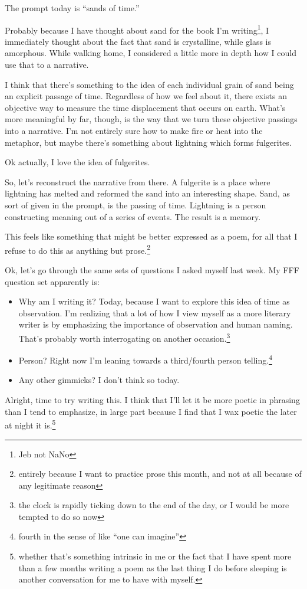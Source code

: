 \documentclass[12pt]{article}[titlepage]
\newcommand{\say}[1]{``#1''}
\newcommand{\1}{\={a}}
\newcommand{\2}{\={e}}
\newcommand{\3}{\={\i}}
\newcommand{\4}{\=o}
\newcommand{\5}{\=u}
\newcommand{\6}{\={A}}
\renewcommand{\,}{\textsuperscript{,}}
\begin{document}
The prompt today is \say{sands of time.}

Probably because I have thought about sand for the book I'm writing\footnote{Jeb not NaNo}, I immediately thought about the fact that sand is crystalline, while glass is amorphous.
While walking home, I considered a little more in depth how I could use that to a narrative.

I think that there's something to the idea of each individual grain of sand being an explicit passage of time.
Regardless of how we feel about it, there exists an objective way to measure the time displacement that occurs on earth.
What's more meaningful by far, though, is the way that we turn these objective passings into a narrative.
I'm not entirely sure how to make fire or heat into the metaphor, but maybe there's something about lightning which forms fulgerites.

Ok actually, I love the idea of fulgerites.

So, let's reconstruct the narrative from there.
A fulgerite is a place where lightning has melted and reformed the sand into an interesting shape.
Sand, as sort of given in the prompt, is the passing of time.
Lightning is a person constructing meaning out of a series of events.
The result is a memory.

This feels like something that might be better expressed as a poem, for all that I refuse to do this as anything but prose.\footnote{entirely because I want to practice prose this month, and not at all because of any legitimate reason}

Ok, let's go through the same sets of questions I asked myself last week.
My FFF question set apparently is:
\begin{itemize}
\item Why am I writing it? Today, because I want to explore this idea of time as observation.
I'm realizing that a lot of how I view myself as a more literary writer is by emphasizing the importance of observation and human naming.
That's probably worth interrogating on another occasion.\footnote{the clock is rapidly ticking down to the end of the day, or I would be more tempted to do so now}
\item Person? Right now I'm leaning towards a third/fourth person telling.\footnote{fourth in the sense of like \say{one can imagine}}
\item Any other gimmicks?
I don't think so today.
\end{itemize}
Alright, time to try writing this.
I think that I'll let it be more poetic in phrasing than I tend to emphasize, in large part because I find that I wax poetic the later at night it is.\footnote{whether that's something intrinsic in me or the fact that I have spent more than a few months writing a poem as the last thing I do before sleeping is another conversation for me to have with myself.}
\end{document}
